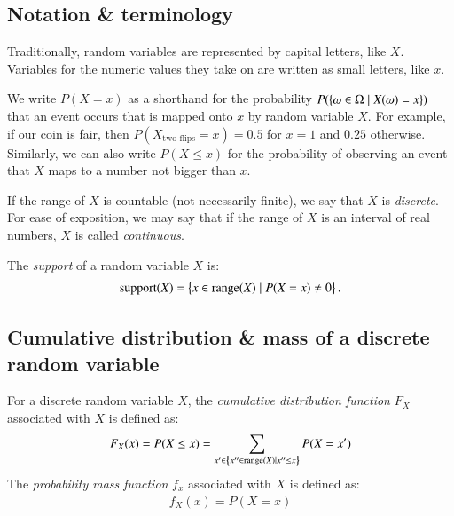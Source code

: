 \documentclass[nobib,nofonts]{tufte-handout}
\renewcommand{\markdef}[1]{\emph{#1}}
\begin{document}
\subsection{Notation \& terminology}

Traditionally, random variables are represented by capital letters, like $X$. Variables for the
numeric values they take on are written as small letters, like $x$.

We write $P(X = x)$ as a shorthand for the probability
$P(\left\{\omega \in \Omega \mid X(\omega) = x\right\})$ that an event occurs that is mapped onto $x$ by
random variable $X$. For example, if our coin is fair, then $P(X_{\text{two flips}} = x) = 0.5$
for $x=1$ and $0.25$ otherwise. Similarly, we can also write $P(X \le x)$ for the probability
of observing an event that $X$ maps to a number not bigger than $x$.

If the range of $X$ is countable (not necessarily finite), we say that $X$ is \markdef{discrete}. For ease of exposition, we may say that if the range of $X$ is an interval of real numbers, $X$ is called \markdef{continuous}.

The \emph{support} of a random variable $X$ is:
\begin{align*}
  \text{support}(X) = \left\{x \in \text{range}(X) \mid P(X = x) \neq 0\right\}.
\end{align*}

\subsection{Cumulative distribution \& mass of a discrete random variable}

For a discrete random variable $X$, the \markdef{cumulative distribution function} $F_X$
associated with $X$ is defined as:
\begin{align*}
  F_X(x) = P(X \le x) = \sum_{x' \in \left\{x'' \in \text{range}(X) \mid x'' \le x\right\}} P(X = x')
\end{align*}
The \markdef{probability mass function} $f_x$ associated with $X$ is defined as:
\begin{align*}
  f_X(x) = P(X = x)
\end{align*}
\end{document}
